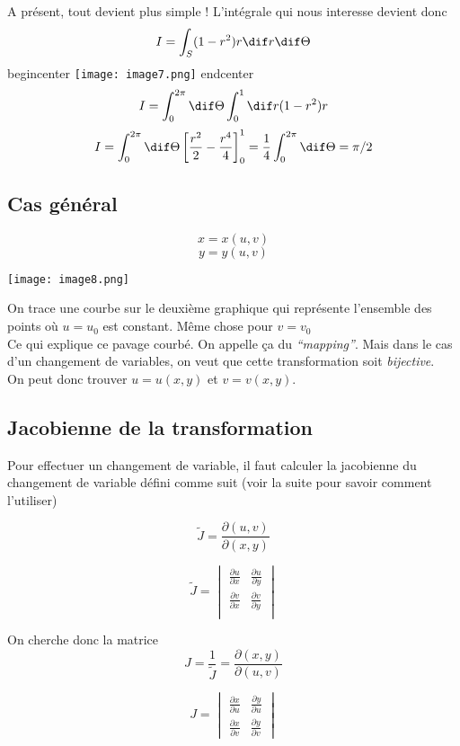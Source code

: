 A présent, tout devient plus simple ! L'intégrale qui nous interesse devient donc
\[I=\int_S (1-r^2)r \dif r \dif\Theta\]
begin{center}
\texttt{[image: image7.png]}
end{center}
\[I=\int_0^{2\pi} \dif\Theta \int_0^1 \dif r (1-r^2) r \]
\[I = \int_0^{2\pi} \dif \Theta \left[\frac{r^2}{2}-\frac{r^4}{4} \right]_0^1 = \frac{1}{4} \int_0^{2\pi} \dif \Theta = \pi/2 \]

\subsection{Cas général}

$$x=x(u,v)$$
$$y=y(u,v)$$
\begin{center}
\texttt{[image: image8.png]}
\end{center}

On trace une courbe sur le deuxième graphique qui représente l'ensemble des points où $u=u_0$ est constant. Même chose pour $v=v_0$\\
Ce qui explique ce pavage \og courbé\fg{}. On appelle ça du \textit{``mapping''}. Mais dans le cas d'un changement de variables, on veut que cette transformation soit \emph{bijective}.\\

On peut donc trouver $u=u(x,y)$ et $v=v(x,y)$.

\subsection{Jacobienne de la transformation}

Pour effectuer un changement de variable, il faut calculer la jacobienne du changement de variable défini comme suit (voir la suite pour savoir comment l'utiliser)

\[\tilde{J}=\frac{\partial (u,v)}{\partial (x,y) }\]

\[\tilde{J} =
\begin{vmatrix}
\frac{\partial u}{\partial x} &\frac{\partial u}{\partial y}\\
\frac{\partial v}{\partial x} &\frac{\partial v}{\partial y}\\
\end{vmatrix}
\]

On cherche donc la matrice $$J=\dfrac{1}{\tilde{J}}=\frac{\partial ( x,y) }{\partial ( u,v)}$$


$$J = \begin{vmatrix}
\frac{\partial x}{\partial u} &\frac{\partial y}{\partial u}\\
\frac{\partial x} {\partial v}&\frac{\partial y}{\partial v}
\end{vmatrix}$$


